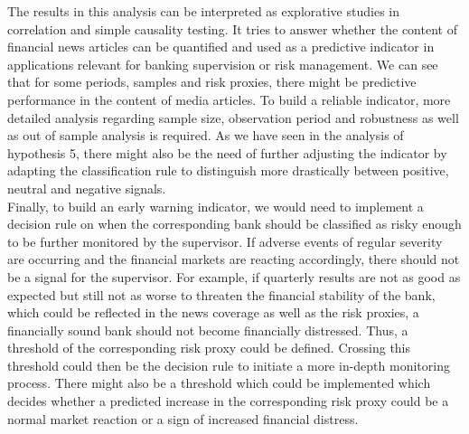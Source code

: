 The results in this analysis can be interpreted as explorative studies in correlation and simple causality testing. It tries to answer whether the content of financial news articles can be quantified and used as a predictive indicator in applications relevant for banking supervision or risk management. We can see that for some periods, samples and risk proxies, there might be predictive performance in the content of media articles. To build a reliable indicator, more detailed analysis regarding sample size, observation period and robustness as well as out of sample analysis is required. As we have seen in the analysis of hypothesis 5, there might also be the need of further adjusting the indicator by adapting the classification rule to distinguish more drastically between positive, neutral and negative signals. \\

Finally, to build an early warning indicator, we would need to implement a decision rule on when the corresponding bank should be classified as risky enough to be further monitored by the supervisor. If adverse events of regular severity are occurring and the financial markets are reacting accordingly, there should not be a signal for the supervisor. For example, if quarterly results are not as good as expected but still not as worse to threaten the financial stability of the bank, which could be reflected in the news coverage as well as the risk proxies, a financially sound bank should not become financially distressed. Thus, a threshold of the corresponding risk proxy could be defined. Crossing this threshold could then be the decision rule to initiate a more in-depth monitoring process. There might also be a threshold which could be implemented which decides whether a predicted increase in the corresponding risk proxy could be a normal market reaction or a sign of increased financial distress. \\

